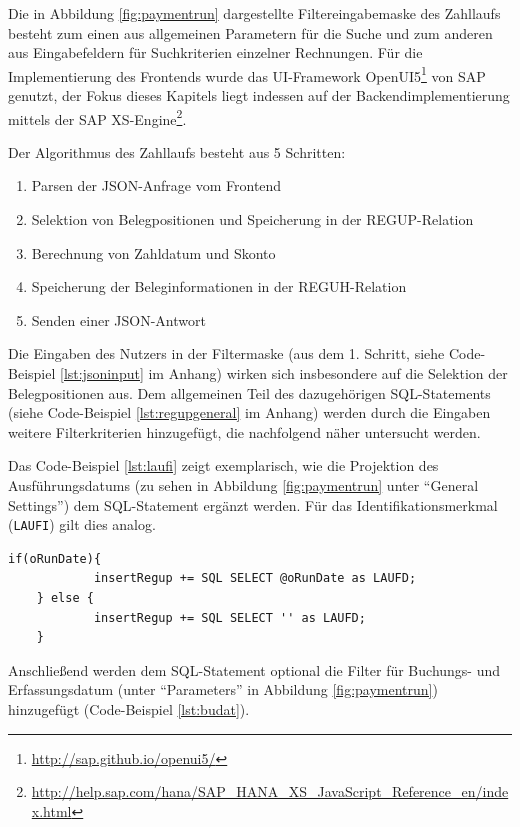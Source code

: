 Die in Abbildung \ref{fig:paymentrun} dargestellte Filtereingabemaske des Zahllaufs besteht zum einen aus allgemeinen Parametern für die Suche und zum anderen aus Eingabefeldern für Suchkriterien einzelner Rechnungen.
Für die Implementierung des Frontends wurde das UI-Framework OpenUI5\footnote{\url{http://sap.github.io/openui5/}} von SAP genutzt, der Fokus dieses Kapitels liegt indessen auf der Backendimplementierung mittels der SAP XS-Engine\footnote{\url{http://help.sap.com/hana/SAP_HANA_XS_JavaScript_Reference_en/index.html}}.

Der Algorithmus des Zahllaufs besteht aus 5 Schritten:
   \begin{enumerate}
      \item Parsen der JSON-Anfrage vom Frontend
			\item Selektion von Belegpositionen und Speicherung in der REGUP-Relation
			\item Berechnung von Zahldatum und Skonto
			\item Speicherung der Beleginformationen in der REGUH-Relation
			\item Senden einer JSON-Antwort
   \end{enumerate}

Die Eingaben des Nutzers in der Filtermaske (aus dem 1. Schritt, siehe Code-Beispiel \ref{lst:jsoninput} im Anhang) wirken sich insbesondere auf die Selektion der Belegpositionen aus.
Dem allgemeinen Teil des dazugehörigen SQL-Statements (siehe Code-Beispiel \ref{lst:regupgeneral} im Anhang) werden durch die Eingaben weitere Filterkriterien hinzugefügt, die nachfolgend näher untersucht werden.

Das Code-Beispiel \ref{lst:laufi} zeigt exemplarisch, wie die Projektion des Ausführungsdatums (zu sehen in Abbildung \ref{fig:paymentrun} unter ``General Settings'') dem SQL-Statement ergänzt werden.
Für das Identifikationsmerkmal (\texttt{LAUFI}) gilt dies analog.

\begin{lstlisting}[caption={Ergänzung der Projektion im SQL-Statement um das Ausführungsdatum für den Zahllauf}, label={lst:laufi}, language=JavaScriptSQL]
	if(oRunDate){
			insertRegup += SQL SELECT @oRunDate as LAUFD;
	} else {
			insertRegup += SQL SELECT '' as LAUFD;
	}
\end{lstlisting}

Anschließend werden dem SQL-Statement optional die Filter für Buchungs- und Erfassungsdatum (unter ``Parameters'' in Abbildung \ref{fig:paymentrun}) hinzugefügt (Code-Beispiel \ref{lst:budat}).

